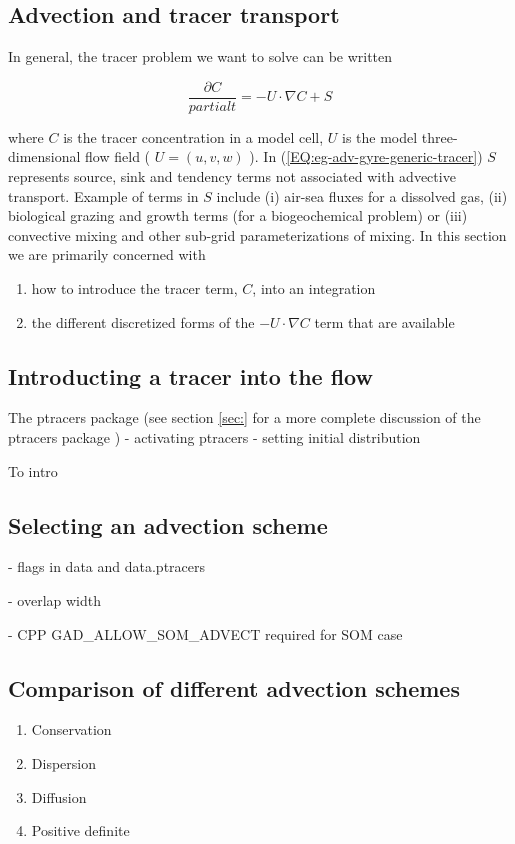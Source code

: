 \subsection{Advection and tracer transport}

In general, the tracer problem we want to solve can be written

\begin{equation}
\label{EQ:eg-adv-gyre-generic-tracer}
\frac{\partial C}{partial t} = -U \cdot \nabla C + S
\end{equation}

where $C$ is the tracer concentration in a model cell, $U$ is the model three-dimensional
flow field ( $U=(u,v,w)$ ). In (\ref{EQ:eg-adv-gyre-generic-tracer}) $S$ represents source, sink 
and tendency terms not associated with advective transport. Example of terms in $S$ include
(i) air-sea fluxes for a dissolved gas, (ii) biological grazing and growth terms (for a 
biogeochemical problem) or (iii) convective mixing and other sub-grid parameterizations of 
mixing. In this section we are primarily concerned with 
\begin{enumerate}
\item how to introduce the tracer term, $C$, into an integration
\item the different discretized forms of 
the $-U \cdot \nabla C$ term that are available
\end{enumerate}


\subsection{Introducting a tracer into the flow}

 The ptracers package (see section \ref{sec:} for a more complete discussion
of the ptracers package )
- activating ptracers
- setting initial distribution

To intro
\subsection{Selecting an advection scheme}

- flags in data and data.ptracers

- overlap width

- CPP GAD_ALLOW_SOM_ADVECT required for SOM case

\subsection{Comparison of different advection schemes}

\begin{enumerate}
\item{Conservation}
\item{Dispersion}
\item{Diffusion}
\item{Positive definite}
\end{enumerate}


 






